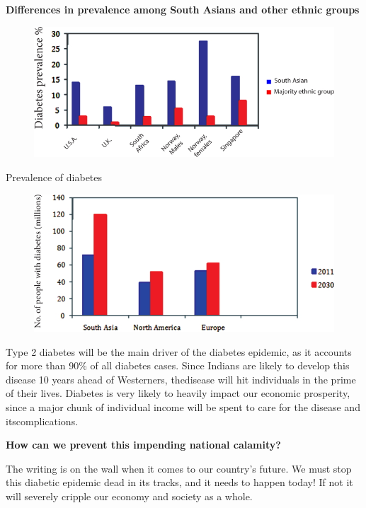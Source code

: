 \noindent\textbf{Differences in prevalence among South Asians and other ethnic groups}

\begin{figure}[h]
\centering
\includegraphics[scale=2.1]{images/032.jpg}
\end{figure}

\clearpage
\begin{center}
Prevalence of diabetes
\end{center}


\begin{figure}[h]
\centering
\includegraphics[scale=2.5]{images/033.jpg}
\end{figure}

Type 2 diabetes will be the main driver of the diabetes epidemic, as it accounts for more than 90\% of all diabetes cases. Since Indians are likely to develop this disease 10 years ahead of Westerners, the\break disease will hit individuals in the prime of their lives. Diabetes is very likely to heavily impact our economic prosperity, since a major chunk of individual income will be spent to care for the disease and its\break complications.

\vskip 8pt
\noindent\textbf{How can we prevent this impending national calamity?}

\vskip 8pt
The writing is on the wall when it comes to our country’s future. We must stop this diabetic epidemic dead in its tracks, and it needs to happen today! If not it will severely cripple our economy and society as a whole.

